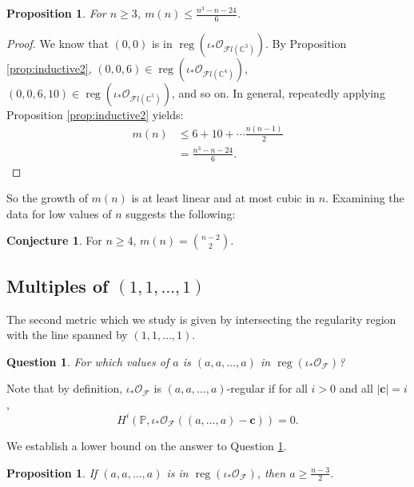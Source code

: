 \documentclass[12pt,reqno]{amsart}
\newtheorem{proposition}[theorem]{Proposition}
\newtheorem{question}[theorem]{Question}
\theoremstyle{definition}
\newtheorem{conj}[theorem]{Conjecture}
\theoremstyle{remark}
\newcommand{\reg}{\operatorname{reg}}
\newcommand{\calF}{{\mathcal{F}}}
\newcommand{\calO}{{\mathcal{O}}}
\begin{document}
\begin{proposition}\label{prop:m(n)upper}
    For $n \geq 3$, $m(n) \leq \frac{n^3-n-24}{6}$.
\end{proposition}

\begin{proof}
    We know that $(0,0)$ is in $\reg(\iota_*\calO_{\calF l(\mathbb C^3)})$.  By Proposition \ref{prop:inductive2}, $(0,0,6) \in \reg(\iota_*\calO_{\calF l(\mathbb C^4)})$, $(0,0,6,10) \in \reg(\iota_*\calO_{\calF l(\mathbb C^5)})$, and so on.  In general, repeatedly applying Proposition \ref{prop:inductive2} yields:
    \begin{align*}
    m(n) &\leq 6+10+\cdots \frac{n(n-1)}{2}\\
    &= \frac{n^3-n-24}{6}.
    \end{align*}
\end{proof}

So the growth of $m(n)$ is at least linear and at most cubic in $n$.  Examining the data for low values of $n$ suggests the following:

\begin{conj}\label{conj:m(n)}
    For $n \geq 4$, $m(n) = \binom{n-2}{2}$.
\end{conj}

\subsection{Multiples of $(1,1,\ldots,1)$}

The second metric which we study is given by intersecting the regularity region with the line spanned by $(1,1,\ldots,1)$.

\begin{question}\label{QAllOnes}
    For which values of $a$ is $(a,a,\ldots,a)$ in $\reg(\iota_*\calO_{\calF})$?
\end{question}

Note that by definition, $\iota_*\calO_{\calF}$ is $(a,a,\ldots,a)$-regular if for all $i>0$ and all $|\mathbf c| = i$,
\begin{equation*}
    H^i(\mathbb P,\iota_*\calO_{\calF}((a,\ldots,a)-\mathbf c)) =0.
\end{equation*}

We establish a lower bound on the answer to Question \ref{QAllOnes}.

\begin{proposition}
\label{prop:dLowerBound}
If $(a,a,\ldots,a)$ is in $\reg(\iota_*\calO_{\calF})$, then $a \geq \frac{n-3}{2}$.
\end{proposition}
\end{document}
